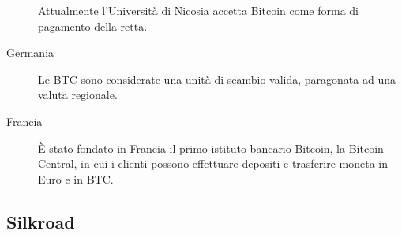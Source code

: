 \begin{description}
 Attualmente l'Università di Nicosia accetta Bitcoin come forma di pagamento della retta.
 \item[Germania] Le BTC sono considerate una unità di scambio valida, paragonata ad una valuta regionale.
 \item[Francia] È stato fondato in Francia il primo istituto bancario Bitcoin, la Bitcoin-Central, in cui i clienti possono effettuare depositi e trasferire moneta in Euro e in BTC.
\end{description}

\subsection{Silkroad}\label{silkroad}